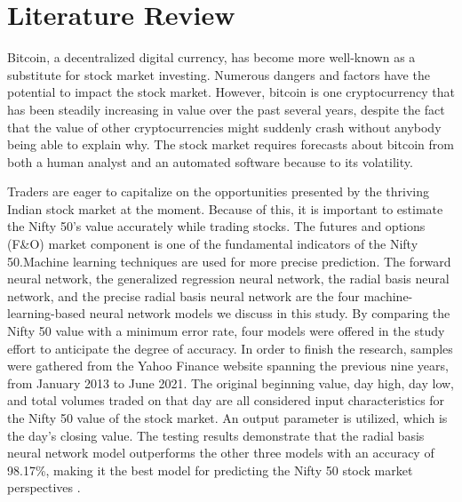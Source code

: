 \chapter{Literature Review}
\label{ch:lit_rev} %

Bitcoin, a decentralized digital currency, has become more well-known as a substitute for stock market investing. Numerous dangers and factors have the potential to impact the stock market. However, bitcoin is one cryptocurrency that has been steadily increasing in value over the past several years, despite the fact that the value of other cryptocurrencies might suddenly crash without anybody being able to explain why. The stock market requires forecasts about bitcoin from both a human analyst and an automated software because to its volatility. 

Traders are eager to capitalize on the opportunities presented by the thriving Indian stock market at the moment. Because of this, it is important to estimate the Nifty 50's value accurately while trading stocks. The futures and options (F\&O) market component is one of the fundamental indicators of the Nifty 50.Machine learning techniques are used for more precise prediction. The forward neural network, the generalized regression neural network, the radial basis neural network, and the precise radial basis neural network are the four machine-learning-based neural network models we discuss in this study. By comparing the Nifty 50 value with a minimum error rate, four models were offered in the study effort to anticipate the degree of accuracy. In order to finish the research, samples were gathered from the Yahoo Finance website spanning the previous nine years, from January 2013 to June 2021. The original beginning value, day high, day low, and total volumes traded on that day are all considered input characteristics for the Nifty 50 value of the stock market. An output parameter is utilized, which is the day's closing value. The testing results demonstrate that the radial basis neural network model outperforms the other three models with an accuracy of 98.17\%, making it the best model for predicting the Nifty 50 stock market perspectives \citep{lamba2021comparative}.


